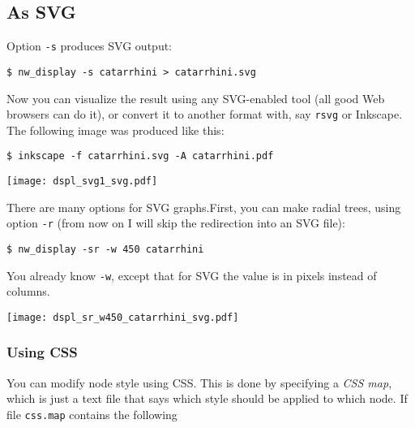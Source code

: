 \documentclass[a4paper,10pt]{report}
\newcommand{\svg}{\textsc{SVG}}
\newcommand{\css}{\textsc{CSS}}
\begin{document}



\subsection{As \svg}
\label{sct_display_svg}

Option \texttt{-s} produces \svg{} output:

\begin{verbatim}
$ nw_display -s catarrhini > catarrhini.svg
\end{verbatim}

Now you can visualize the result using any \svg-enabled tool (all good Web browsers can do it), or convert it to another format with, say \texttt{rsvg} or Inkscape. The following image was produced like this:

\begin{verbatim}
$ inkscape -f catarrhini.svg -A catarrhini.pdf
\end{verbatim}

\begin{center}
 \texttt{[image: dspl\_svg1\_svg.pdf]}
\end{center}

There are many options for \svg{} graphs.First, you can make radial trees, using option \texttt{-r} (from now on I will skip the redirection into an \svg{} file):

\begin{verbatim}
$ nw_display -sr -w 450 catarrhini
\end{verbatim}


You already know \texttt{-w}, except that for \svg{} the value is in pixels instead of columns. 

\begin{center}
 \texttt{[image: dspl\_sr\_w450\_catarrhini\_svg.pdf]}
\end{center}

\subsubsection{Using \css}
\label{sct_display_svg_css}

You can modify node style using \css. This is done by specifying a \textit{\css{} map}, which is just a text file that says which style should be applied to which node. If file \texttt{css.map} contains the following


\end{document}
